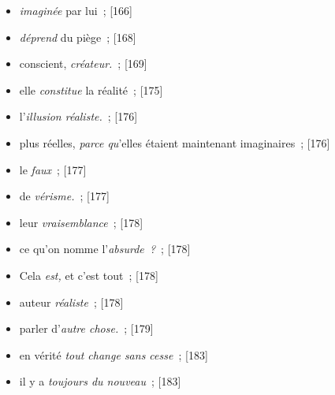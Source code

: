 \documentclass[12pt, a4paper]{article}
\begin{document}
\begin{itemize}
    \item \textit{imaginée }par lui{\color{gray}~; [166]}

    \item \textit{déprend} du piège{\color{gray}~; [168]}

    \item conscient, \textit{créateur.}{\color{gray}~; [169]}

    \item elle \textit{constitue} la réalité{\color{gray}~; [175]}

    \item l’\textit{illusion réaliste.}{\color{gray}~; [176]}

    \item plus réelles, \textit{parce qu}’elles étaient maintenant imaginaires{\color{gray}~; [176]}

    \item le \textit{faux}{\color{gray}~; [177]}

    \item de \textit{vérisme.}{\color{gray}~; [177]}

    \item leur \textit{vraisemblance}{\color{gray}~; [178]}

    \item ce qu’on nomme l’\textit{absurde~?}{\color{gray}~; [178]}

    \item Cela \textit{est,} et c’est tout{\color{gray}~; [178]}

    \item auteur \textit{réaliste}{\color{gray}~; [178]}

    \item parler d’\textit{autre chose.}{\color{gray}~; [179]}

    \item en vérité \textit{tout change sans cesse}{\color{gray}~; [183]}

    \item il y a \textit{toujours du nouveau}{\color{gray}~; [183]}
\end{itemize}
\newpage
\tableofcontents
\end{document}
